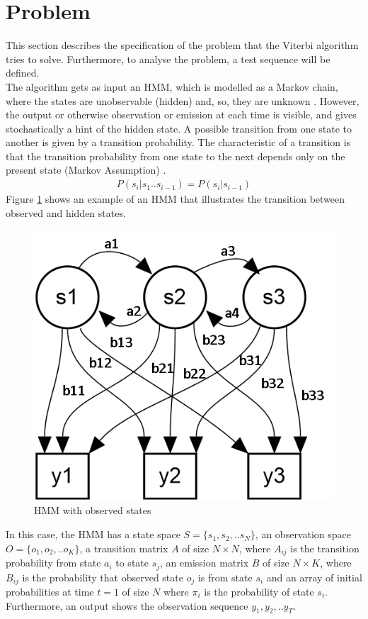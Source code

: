 \documentclass[12pt,journal,compsoc]{IEEEtran}
\begin{document}
\section{Problem}
This section describes the specification of the problem that the Viterbi algorithm tries to solve. Furthermore, to analyse the problem, a test sequence will be defined. \\
The algorithm gets as input an HMM, which is modelled as a Markov chain, where the states are unobservable (hidden) and, so, they are unknown \cite{slade2012viterbi}. 
However, the output or otherwise observation or emission at each time is visible, and gives stochastically a hint of the hidden state. A possible transition from one state to another is given by a transition probability. The characteristic of a transition is that the transition probability from one state to the next depends only on the present state (Markov Assumption) \cite{article:forney}. 
\begin{align*}
  P(s_i|s_1..s_{i-1}) = P(s_i|s_{i-1})
\end{align*}
Figure \ref{fig1}  shows an example of an HMM that illustrates the transition between observed and hidden states. 
 \begin{figure}[ht]
	\centering
  	\includegraphics[scale=0.65]{figures/fif1_HMM.png}
	\caption{HMM with observed states}
	\label{fig1}
\end{figure}
In this case, the HMM has a state space $S = \{s_1, s_2, .. s_N\}$, an observation space $O=\{o_1, o_2,.. o_K\}$, a transition matrix $A$ of size $N{\times}N$, where $A_{ij}$  is the transition probability from state $a_i$  to state $s_j$, an emission matrix $B$ of size $N{\times}K$, where $B_{ij}$ is the probability that observed state $o_j$ is from state $s_i$ and an array of initial probabilities at time $t=1$ of size $N$  where $\pi_i$  is the probability of state $s_i$. Furthermore, an output shows the observation sequence $y_1, y_2, .. y_T$. \\
\end{document}
